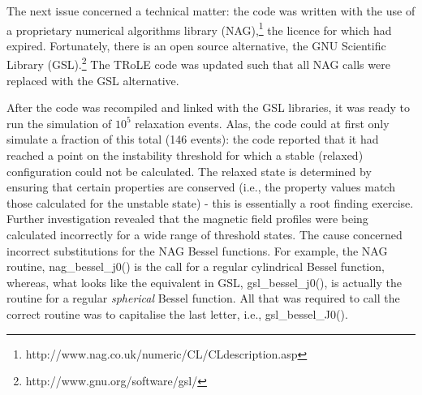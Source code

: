 The next issue concerned a technical matter: the code was written with the use of a proprietary numerical algorithms library (NAG),\footnote{http://www.nag.co.uk/numeric/CL/CLdescription.asp} the licence for which had expired. Fortunately, there is an open source alternative, the GNU Scientific Library (GSL).\footnote{http://www.gnu.org/software/gsl/} The TRoLE code was updated such that all NAG calls were replaced with the GSL alternative. 

After the code was recompiled and linked with the GSL libraries, it was ready to run the simulation of $10^5$ relaxation events. Alas, the code could at first only simulate a fraction of this total (146 events): the code reported that it had reached a point on the instability threshold for which a stable (relaxed) configuration could not be calculated. The relaxed state is determined by ensuring that certain properties are conserved (i.e., the property values match those calculated for the unstable state) - this is essentially a root finding exercise. Further investigation revealed that the magnetic field profiles were being calculated incorrectly for a wide range of threshold states. The cause concerned incorrect substitutions for the NAG Bessel functions. For example, the NAG routine, nag\_bessel\_j0() is the call for a regular cylindrical Bessel function, whereas, what looks like the equivalent in GSL, gsl\_bessel\_j0(), is actually the routine for a regular \textit{spherical} Bessel function. All that was required to call the correct routine was to capitalise the last letter, i.e., gsl\_bessel\_J0().
 
